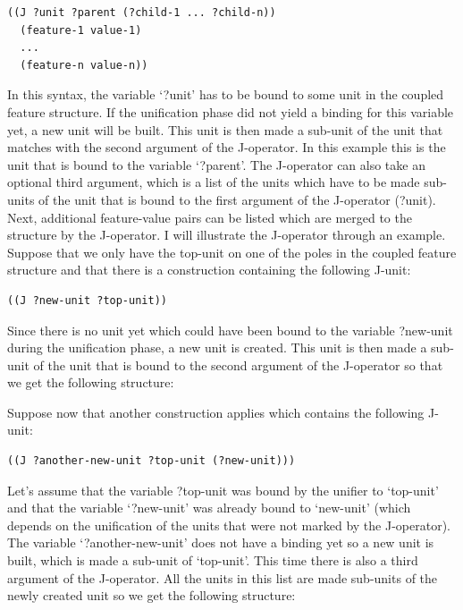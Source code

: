 \ea
\label{ex:j-operator}
\footnotesize{\begin{verbatim}
((J ?unit ?parent (?child-1 ... ?child-n))
  (feature-1 value-1)
  ...
  (feature-n value-n))
\end{verbatim}}
\z

In this syntax, the variable `?unit' has to be bound to some unit in the coupled feature structure. If the unification phase did not yield a binding for this variable yet, a new unit will be built. This unit is then made a sub-unit of the unit that matches with the second argument of the J-operator. In this example this is the unit that is bound to the variable `?parent'. The J-operator can also take an optional third argument, which is a list of the units which have to be made sub-units of the unit that is bound to the first argument of the J-operator (?unit). Next, additional feature-value pairs can be listed which are merged to the structure by the J-operator. I will illustrate the J-operator through an example. Suppose that we only have the top-unit on one of the poles in the coupled feature structure and that there is a construction containing the following J-unit:

{\footnotesize\begin{verbatim}
((J ?new-unit ?top-unit))
\end{verbatim}
}

Since there is no unit yet which could have been bound to the variable ?new-unit during the unification phase, a new unit is created. This unit is then made a sub-unit of the unit that is bound to the second argument of the J-operator so that we get the following structure:

\ea
{}
\z

Suppose now that another construction applies which contains the following J-unit:

{\footnotesize\begin{verbatim}
((J ?another-new-unit ?top-unit (?new-unit)))
\end{verbatim}}

Let's assume that the variable ?top-unit was bound by the unifier to `top-unit' and that the variable `?new-unit' was already bound to `new-unit' (which depends on the unification of the units that were not marked by the J-operator). The variable `?another-new-unit' does not have a binding yet so a new unit is built, which is made a sub-unit of `top-unit'. This time there is also a third argument of the J-operator. All the units in this list are made sub-units of the newly created unit so we get the following structure:

